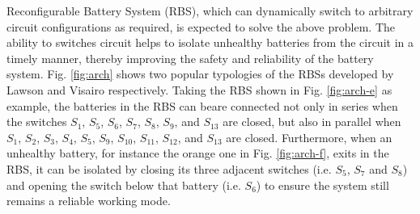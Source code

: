 \documentclass{article}
\begin{document}
Reconfigurable Battery System (RBS), which can dynamically switch to arbitrary circuit configurations as required, is expected to solve the above problem\cite{hanNextGenerationBatteryManagement2020a}. 
The ability to switches circuit helps to isolate unhealthy batteries from the circuit in a timely manner, thereby improving the safety and reliability of the battery system.
Fig. \ref{fig:arch} shows two popular typologies of the RBSs developed by Lawson\cite{lawsonSoftwareConfigurableBattery2012} and Visairo \cite{visairoReconfigurableBatteryPack2008} respectively. 
Taking the RBS shown in Fig. \ref{fig:arch-e} as example, the batteries in the RBS can beare connected not only in series when the switches $S_1$, $S_5$, $S_6$, $S_7$, $S_8$, $S_9$, and $S_{13}$ are closed, but also in parallel when $S_1$, $S_2$, $S_3$, $S_4$, $S_5$, $S_9$, $S_{10}$, $S_{11}$, $S_{12}$, and $S_{13}$ are closed.
Furthermore, when an unhealthy battery, for instance the orange one in Fig. \ref{fig:arch-f}, exits in the RBS, it can be isolated by closing its three adjacent switches (i.e. $S_5$, $S_7$ and $S_8$) and opening the switch below that battery (i.e. $S_6$) to ensure the system still remains a reliable working mode.
\end{document}
